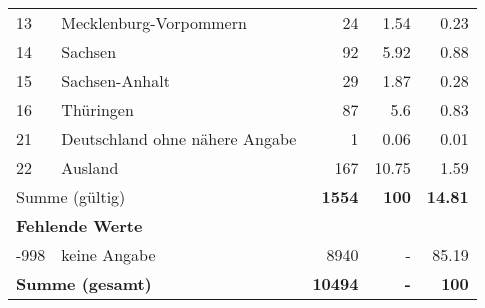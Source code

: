 \begin{longtable}{lXrrr}
     13 &
     \multicolumn{1}{X}{ Mecklenburg-Vorpommern   } &


       \num{24} &
       \num[round-mode=places,round-precision=2]{1.54} &
         \num[round-mode=places,round-precision=2]{0.23} \\

     14 &
     \multicolumn{1}{X}{ Sachsen   } &


       \num{92} &
       \num[round-mode=places,round-precision=2]{5.92} &
         \num[round-mode=places,round-precision=2]{0.88} \\

     15 &
     \multicolumn{1}{X}{ Sachsen-Anhalt   } &


       \num{29} &
       \num[round-mode=places,round-precision=2]{1.87} &
         \num[round-mode=places,round-precision=2]{0.28} \\

     16 &
     \multicolumn{1}{X}{ Thüringen   } &


       \num{87} &
       \num[round-mode=places,round-precision=2]{5.6} &
         \num[round-mode=places,round-precision=2]{0.83} \\

     21 &
     \multicolumn{1}{X}{ Deutschland ohne nähere Angabe   } &


       \num{1} &
       \num[round-mode=places,round-precision=2]{0.06} &
         \num[round-mode=places,round-precision=2]{0.01} \\

     22 &
     \multicolumn{1}{X}{ Ausland   } &


       \num{167} &
       \num[round-mode=places,round-precision=2]{10.75} &
         \num[round-mode=places,round-precision=2]{1.59} \\
     \midrule
     \multicolumn{2}{l}{Summe (gültig)} &
       \textbf{\num{1554}} &
     \textbf{\num{100}} &
       \textbf{\num[round-mode=places,round-precision=2]{14.81}} \\
     \multicolumn{5}{l}{\textbf{Fehlende Werte}}\\
       -998 &
       keine Angabe &
         \num{8940} &
        - &
         \num[round-mode=places,round-precision=2]{85.19} \\
     \midrule
     \multicolumn{2}{l}{\textbf{Summe (gesamt)}} &
          \textbf{\num{10494}} &
        \textbf{-} &
        \textbf{\num{100}} \\
     \bottomrule
     \end{longtable}
     

